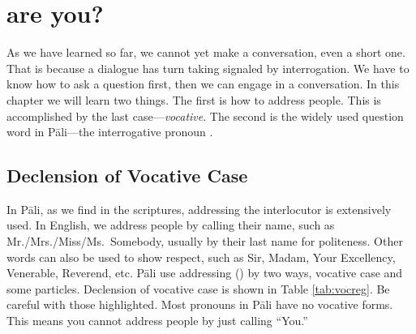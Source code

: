 \chapter{ are you?}\label{chap:vockim}

As we have learned so far, we cannot yet make a conversation, even a short one. That is because a dialogue has turn taking signaled by interrogation. We have to know how to ask a question first, then we can engage in a conversation. In this chapter we will learn two things. The first is how to address people. This is accomplished by the last case---\emph{vocative}. The second is the widely used question word in P\=ali---the interrogative pronoun .

{}
\section*{Declension of Vocative Case}

In P\=ali, as we find in the scriptures, addressing the interlocutor is extensively used. In English, we address people by calling their name, such as Mr./Mrs./Miss/Ms.\ Somebody, usually by their last name for politeness. Other words can also be used to show respect, such as Sir, Madam, Your Excellency, Venerable, Reverend, etc. P\=ali use addressing () by two ways, vocative case and some particles. Declension of vocative case is shown in Table \ref{tab:vocreg}. Be careful with those highlighted. Most pronouns in P\=ali have no vocative forms. This means you cannot address people by just calling ``You.''


